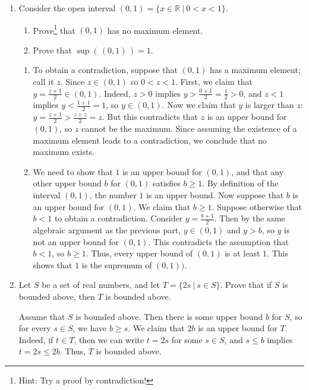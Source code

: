 \documentclass[12pt]{amsart}
\newcommand{\R}{{\mathbb{R}}}
\numberwithin{equation}{section}
\theoremstyle{plain} %
\theoremstyle{definition}
\theoremstyle{remark}
\begin{document}
\begin{enumerate}
\item Consider the open interval $(0,1) = \{ x\in \R \ | \ 0 < x < 1\}$. 
\begin{enumerate}
\item Prove\footnote{Hint: Try a proof by contradiction!} that $(0,1)$ has no maximum element.
\item Prove that $\sup(\, (0,1) \, ) = 1$.
\end{enumerate}

\begin{framed}
\begin{enumerate}
\item To obtain a contradiction, suppose that $(0,1)$ has a maximum element; call it $z$. Since $z\in (0,1)$ so $0<z<1$. First, we claim that $y=\frac{z+1}{2}\in (0,1)$. Indeed, $z>0$ implies $y> \frac{0+1}{2} = \frac{1}{2} >0$, and $z<1$ implies $y < \frac{1+1}{2} = 1$, so $y\in (0,1)$. Now we claim that $y$ is larger than $z$: $y=\frac{z+1}{2} > \frac{z + z}{2} = z$. But this contradicts that $z$ is an upper bound for $(0,1)$, so $z$ cannot be the maximum. Since assuming the existence of a maximum element leads to a contradiction, we conclude that no maximum exists.

\item We need to show that $1$ is an upper bound for $(0,1)$, and that any other upper bound $b$ for $(0,1)$ satisfies $b\geq 1$. By definition of the interval $(0,1)$, the number $1$ is an upper bound. Now suppose that $b$ is an upper bound for $(0,1)$. We claim that $b\geq 1$. Suppose otherwise that $b<1$ to obtain a contradiction. Consider $y=\frac{b+1}{2}$. Then by the same algebraic argument as the previous part, $y\in (0,1)$ and $y>b$, so $y$ is not an upper bound for $(0,1)$. This contradicts the assumption that $b<1$, so $b\geq 1$. Thus, every upper bound of $(0,1)$ is at least $1$. This shows that $1$ is the supremum of $(0,1))$.
\end{enumerate}
\end{framed}

\item Let $S$ be a set of real numbers, and let $T=\{ 2s \ | \ s\in S\}$. Prove that if $S$ is bounded above, then $T$ is bounded above.


\begin{framed}
Assume that $S$ is bounded above. Then there is some upper bound $b$ for $S$, so for every $s\in S$, we have $b\geq s$. We claim that $2b$ is an upper bound for $T$. Indeed, if $t\in T$, then we can write $t=2s$ for some $s\in S$, and $s\leq b$ implies $t=2s\leq 2b$. Thus, $T$ is bounded above.
\end{framed}


\end{enumerate}
\end{document}
